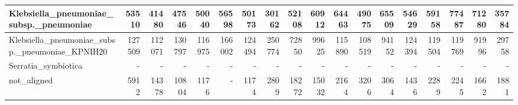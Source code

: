 \documentclass[12pt,a4paper]{article}
\begin{document}
\begin{table}[ht]
\begin{center}
\begin{tabular}{|l*{17}{|r}|}
Klebsiella\_pneumoniae\_subsp.\_pneumoniae & 53510 & 41480 & 47546 & 50040 & 56598 & 50173 & 30162 & 52108 & 60912 & 64463 & 49075 & 65509 & 54629 & 59158 & 77487 & 71280 & 35784 \\ \hline
Klebsiella\_pneumoniae\_subsp.\_pneumoniae\_KPNIH20 & 127509 & 112071 & 130797 & 116975 & 166002 & 124494 & 250774 & 72850 & 99625 & 115890 & 108519 & 94152 & 124394 & 119504 & 119769 & 91996 & 29758 \\ \hline
Serratia\_symbiotica & - & - & - & - & - & - & - & - & - & - & - & - & - & - & - & - & - \\ \hline
not\_aligned & 5912 & 14378 & 10804 & 1176 & - & 1174 & 2809 & 18272 & 15032 & 2164 & 3206 & 3064 & 1436 & 2289 & 2245 & 1662 & 1881 \\ \hline
\end{tabular}
\end{center}
\end{table}
\end{document}
